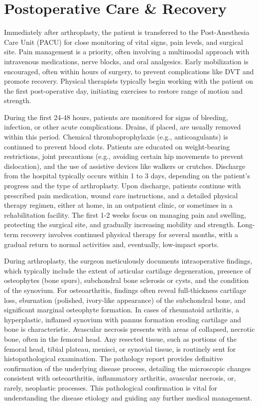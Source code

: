 \section*{Postoperative Care \& Recovery}
Immediately after arthroplasty, the patient is transferred to the Post-Anesthesia Care Unit (PACU) for close monitoring of vital signs, pain levels, and surgical site. Pain management is a priority, often involving a multimodal approach with intravenous medications, nerve blocks, and oral analgesics. Early mobilization is encouraged, often within hours of surgery, to prevent complications like DVT and promote recovery. Physical therapists typically begin working with the patient on the first post-operative day, initiating exercises to restore range of motion and strength.

During the first 24-48 hours, patients are monitored for signs of bleeding, infection, or other acute complications. Drains, if placed, are usually removed within this period. Chemical thromboprophylaxis (e.g., anticoagulants) is continued to prevent blood clots. Patients are educated on weight-bearing restrictions, joint precautions (e.g., avoiding certain hip movements to prevent dislocation), and the use of assistive devices like walkers or crutches. Discharge from the hospital typically occurs within 1 to 3 days, depending on the patient's progress and the type of arthroplasty. Upon discharge, patients continue with prescribed pain medication, wound care instructions, and a detailed physical therapy regimen, either at home, in an outpatient clinic, or sometimes in a rehabilitation facility. The first 1-2 weeks focus on managing pain and swelling, protecting the surgical site, and gradually increasing mobility and strength. Long-term recovery involves continued physical therapy for several months, with a gradual return to normal activities and, eventually, low-impact sports.

During arthroplasty, the surgeon meticulously documents intraoperative findings, which typically include the extent of articular cartilage degeneration, presence of osteophytes (bone spurs), subchondral bone sclerosis or cysts, and the condition of the synovium. For osteoarthritis, findings often reveal full-thickness cartilage loss, eburnation (polished, ivory-like appearance) of the subchondral bone, and significant marginal osteophyte formation. In cases of rheumatoid arthritis, a hyperplastic, inflamed synovium with pannus formation eroding cartilage and bone is characteristic. Avascular necrosis presents with areas of collapsed, necrotic bone, often in the femoral head. Any resected tissue, such as portions of the femoral head, tibial plateau, menisci, or synovial tissue, is routinely sent for histopathological examination. The pathology report provides definitive confirmation of the underlying disease process, detailing the microscopic changes consistent with osteoarthritis, inflammatory arthritis, avascular necrosis, or, rarely, neoplastic processes. This pathological confirmation is vital for understanding the disease etiology and guiding any further medical management.

